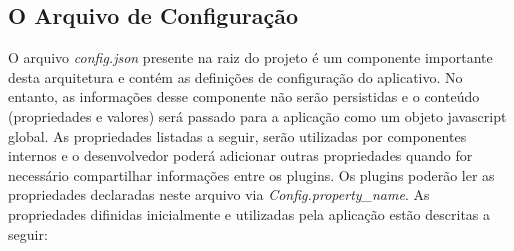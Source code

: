 \subsection{O Arquivo de Configuração}\label{sec:solucao-desenvolvida}
O arquivo \textit{config.json} presente na raiz do projeto é um componente importante desta arquitetura e contém as definições de configuração do aplicativo. No entanto, as informações desse componente não serão persistidas e o conteúdo (propriedades e valores) será passado para a aplicação como um objeto javascript global. As propriedades listadas a seguir, serão utilizadas por componentes internos e o desenvolvedor poderá adicionar outras propriedades quando for necessário compartilhar informações entre os plugins. Os plugins poderão ler as propriedades declaradas neste arquivo via \textit{Config.property\_name}. As propriedades difinidas inicialmente e utilizadas pela aplicação estão descritas a seguir:

